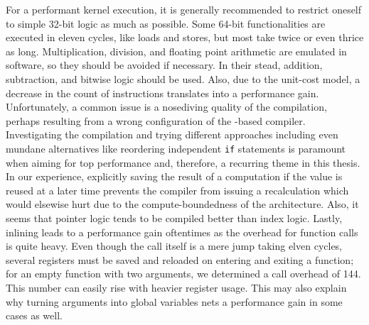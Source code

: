 For a performant kernel execution, it is generally recommended to restrict oneself to simple 32-bit logic as much as possible.
Some 64-bit functionalities are executed in eleven cycles, like loads and stores, but most take twice or even thrice as long.
Multiplication, division, and floating point arithmetic are emulated in software, so they should be avoided if necessary.
In their stead, addition, subtraction, and bitwise logic should be used.
Also, due to the unit-cost model, a decrease in the count of instructions translates into a performance gain.
Unfortunately, a common issue is a nosediving quality of the compilation, perhaps resulting from a wrong configuration of the -based compiler.
Investigating the compilation and trying different approaches \Dash including even mundane alternatives like reordering independent \lstinline[keywords={}]|if| statements \Dash is paramount when aiming for top performance and, therefore, a recurring theme in this thesis.
In our experience, explicitly saving the result of a computation if the value is reused at a later time prevents the compiler from issuing a recalculation which would elsewise hurt due to the compute-boundedness of the architecture.
Also, it seems that pointer logic tends to be compiled better than index logic.
Lastly, inlining leads to a performance gain oftentimes as the overhead for function calls is quite heavy.
Even though the call itself is a mere jump taking elven cycles, several registers must be saved and reloaded on entering and exiting a function;
for an empty function with two arguments, we determined a call overhead of \qty{144}{\cycles}.
This number can easily rise with heavier register usage.
This may also explain why turning arguments into global variables nets a performance gain in some cases as well.
